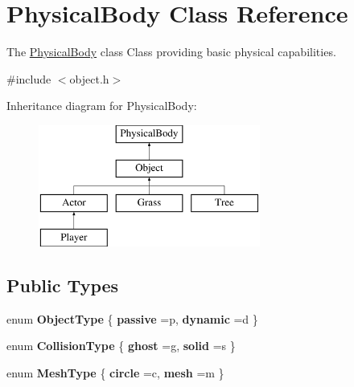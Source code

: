 \hypertarget{classPhysicalBody}{}\section{Physical\+Body Class Reference}
\label{classPhysicalBody}


The \hyperlink{classPhysicalBody}{Physical\+Body} class Class providing basic physical capabilities.  




{\ttfamily \#include $<$object.\+h$>$}

Inheritance diagram for Physical\+Body\+:\begin{figure}[H]
\begin{center}
\leavevmode
\includegraphics[height=4.000000cm]{classPhysicalBody}
\end{center}
\end{figure}
\subsection*{Public Types}
\begin{DoxyCompactItemize}
\item 
\hypertarget{classPhysicalBody_a11477c65415798a49396b51621e54a70}{}enum {\bfseries Object\+Type} \{ {\bfseries passive} =\textquotesingle{}p\textquotesingle{}, 
{\bfseries dynamic} =\textquotesingle{}d\textquotesingle{}
 \}\label{classPhysicalBody_a11477c65415798a49396b51621e54a70}

\item 
\hypertarget{classPhysicalBody_acfa77263f0e8da678d36bf0a8dde0ed0}{}enum {\bfseries Collision\+Type} \{ {\bfseries ghost} =\textquotesingle{}g\textquotesingle{}, 
{\bfseries solid} =\textquotesingle{}s\textquotesingle{}
 \}\label{classPhysicalBody_acfa77263f0e8da678d36bf0a8dde0ed0}

\item 
\hypertarget{classPhysicalBody_a0242d98735161b0fb3364f21a59eaf41}{}enum {\bfseries Mesh\+Type} \{ {\bfseries circle} =\textquotesingle{}c\textquotesingle{}, 
{\bfseries mesh} =\textquotesingle{}m\textquotesingle{}
 \}\label{classPhysicalBody_a0242d98735161b0fb3364f21a59eaf41}

\end{DoxyCompactItemize}
